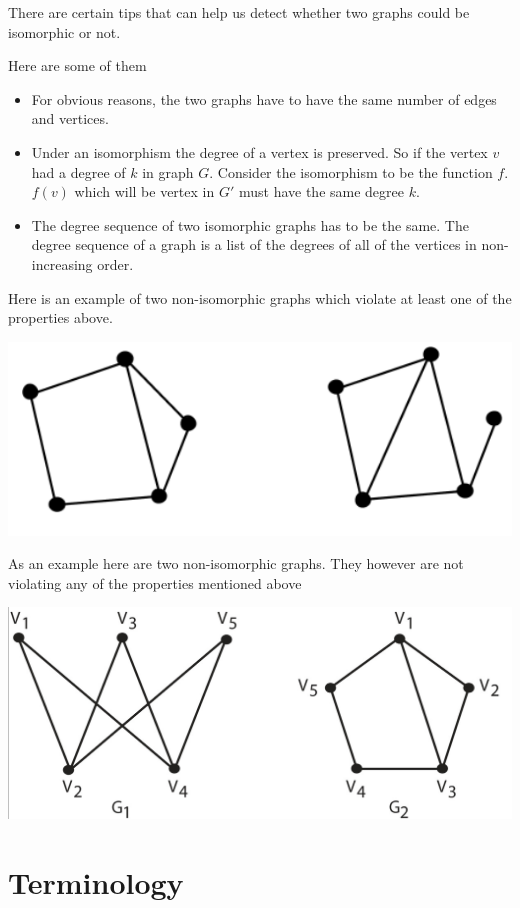 \documentclass[12pt]{article}
\begin{document}
There are certain tips that can help us detect whether two graphs could be isomorphic or not.

Here are some of them

\begin{itemize}
\item For obvious reasons, the two graphs have to have the same number of edges and vertices.
\item Under an isomorphism the degree of a vertex is preserved. So if the vertex $v$ had a degree of $k$ in graph $G$. Consider the isomorphism to be the function $f$. $f(v)$ which will be vertex in $G'$ must have the same degree $k$.
\item The degree sequence of two isomorphic graphs has to be the same. The degree sequence of a graph is a list of the degrees of all of the vertices in non-increasing order.
\end{itemize}

Here is an example of two non-isomorphic graphs which violate at least one of the properties above.

\includegraphics[scale=0.5]{nonisodeg.png}


As an example here are two non-isomorphic graphs. They however are not violating any of the properties mentioned above

\includegraphics[scale=0.5]{noniso.png}


\section*{Terminology}
\end{document}
